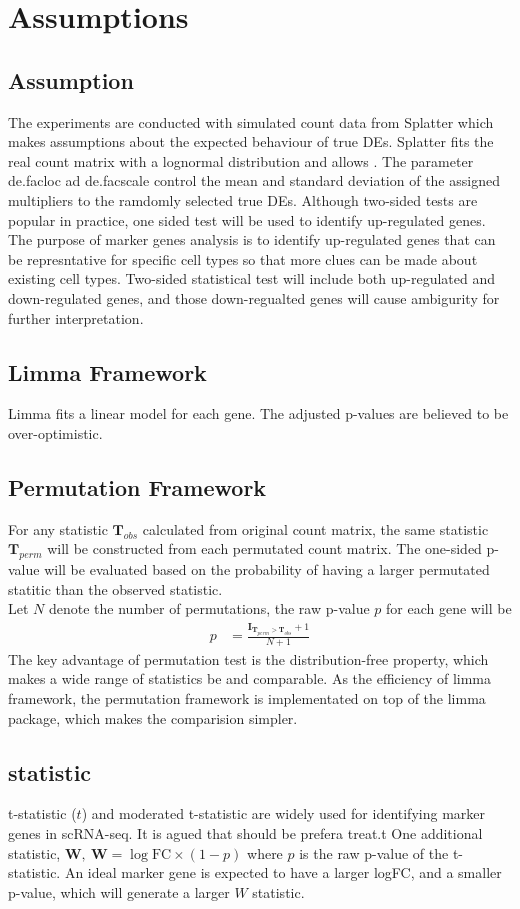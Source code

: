 \chapter{Assumptions}
\section{Assumption}
The experiments are conducted with simulated count data from Splatter which makes assumptions about the expected behaviour of true DEs. 
Splatter fits the real count matrix with a lognormal distribution and allows . The parameter de.facloc ad de.facscale control the mean and standard deviation of the assigned multipliers to the ramdomly selected true DEs. 
Although two-sided tests are popular in practice, one sided test will be used to identify up-regulated genes. The purpose of marker genes analysis is to identify up-regulated genes that can be represntative for specific cell types so that more clues can be made about existing cell types. Two-sided statistical test will include both up-regulated and down-regulated genes, and those down-regualted genes will cause ambigurity for further interpretation. 
\section{Limma Framework}
Limma fits a linear model for each gene. The adjusted p-values are believed to be over-optimistic. 
\section{Permutation Framework}
For any statistic $\textbf{T}_{obs}$ calculated from original count matrix, the same statistic $\textbf{T}_{perm}$ will be constructed from each permutated count matrix. The one-sided p-value will be evaluated based on the probability of having a larger permutated statitic than the observed statistic.\\
Let $N$ denote the number of permutations, the raw p-value $p$ for each gene will be 
\begin{align*} 
	p &=  \frac{\textbf{I}_{\textbf{T}_{perm} > \textbf{T}_{obs}} + 1}{N+1} 
\end{align*}
The key advantage of permutation test is the distribution-free property, which makes a wide range of statistics be and comparable.   
As the efficiency of limma framework, the permutation framework is implementated on top of the limma package, which makes the comparision simpler. 
\section{statistic}
t-statistic ($t$) and moderated t-statistic \modt are widely used for identifying marker genes in scRNA-seq. 
It is agued that \modt should be prefera
treat.t 
One additional statistic, $\textbf{W}, ~ \textbf{W} = \log \mathrm{FC} \times (1 - p) $ where $p$ is the raw p-value of the t-statistic. 
An ideal marker gene is expected to have a larger logFC, and a smaller p-value, which will generate a larger $W$ statistic. 